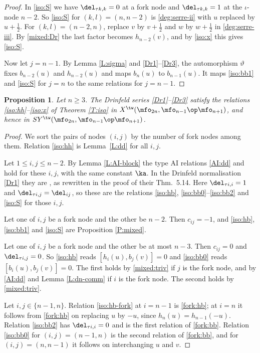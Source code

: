 \documentclass{amsart}
\newtheorem{prop}[theorem]{Proposition}
\numberwithin{equation}{section}
\theoremstyle{remark}
\renewcommand{\,}{\kern 0.1em} %
\begin{document}
\begin{proof}
In \eqref{iso:S} we have $\del_{\tau k,k}=0$ at a fork node and $\del_{\tau k,k}=1$ at the
$\iota$-node $n-2$. So \eqref{iso:S} for $(k,l)=(n,n-2)$ is \eqref{deg:serre-ii} with $u$
replaced by $u+\frac12$. For $(k,l)=(n-2,n)$, replace $v$ by $v+\frac12$ and $w$ by $w+\frac12$ in
\eqref{deg:serre-iii}. By \eqref{mixed:Dr} the last factor becomes $h_{n-2}(v)$, and by
\eqref{iso:x} this gives \eqref{iso:S}.

Now let $j=n-1$. By Lemma \ref{L:sigma} and \eqref{Dr1}--\eqref{Dr3}, the automorphism
$\vartheta$ fixes $b_{n-2}(u)$ and $h_{n-2}(u)$ and maps $b_n(u)$ to $b_{n-1}(u)$. It maps
\eqref{iso:bb1} and \eqref{iso:S} for $j=n$ to the same relations for $j=n-1$.
%
\end{proof}

\begin{prop} \label{P:rels}
%
Let $n\ge3$. The Drinfeld series \eqref{Dr1}--\eqref{Dr3} satisfy the relations
\eqref{iso:hh}--\eqref{iso:x} of Theorem \ref{T:iso} in
$X^\tw(\mfo_{2n},\mfo_{n-1}\op\mfo_{n+1})$, and hence in $SY^\tw(\mfo_{2n},\mfo_{n-1}\op\mfo_{n+1})$.
%
\end{prop}

\begin{proof}
%
We sort the pairs of nodes $(i,j)$ by the number of fork nodes among them. Relation
\eqref{iso:hh} is Lemma~\ref{L:dd} for all $i,j$.

Let $1\le i,j\le n-2$. By Lemma \ref{L:AI-block} the type AI relations \eqref{AI:dd} and
\cite[(5.5)--(5.10)]{Re26} hold for these $i,j$, with the same constant $\ka$. In the Drinfeld
normalisation \eqref{Dr1} they are \cite[(5.106)--(5.110)]{Re26}, as rewritten in the proof of
their Thm.~5.14. Here $\del_{\tau i,i}=1$ and $\del_{\tau i,j}=\del_{ij}$, so these are the
relations \eqref{iso:hb}, \eqref{iso:bb0}--\eqref{iso:bb2} and \eqref{iso:S} for those $i,j$.

Let one of $i,j$ be a fork node and the other be $n-2$. Then $c_{ij}=-1$, and
\eqref{iso:hb}, \eqref{iso:bb1} and \eqref{iso:S} are Proposition \ref{P:mixed}.

Let one of $i,j$ be a fork node and the other be at most $n-3$. Then $c_{ij}=0$ and
$\del_{\tau i,j}=0$. So \eqref{iso:hb} reads $[h_i(u),b_j(v)]=0$ and \eqref{iso:bb0} reads
$[b_i(u),b_j(v)]=0$. The first holds by \eqref{mixed:triv} if $j$ is the fork node, and by
\eqref{AI:dd} and Lemma \ref{L:dn-comm} if $i$ is the fork node. The second holds by
\eqref{mixed:triv}.

Let $i,j\in\{n-1,n\}$. Relation \eqref{iso:hb-fork} at $i=n-1$ is \eqref{fork:hb}; at $i=n$ it
follows from \eqref{fork:hb} on replacing $u$ by $-u$, since $h_n(u)=h_{n-1}(-u)$. Relation
\eqref{iso:bb2} has $\del_{\tau i,i}=0$ and is the first relation of \eqref{fork:bb}. Relation
\eqref{iso:bb0} for $(i,j)=(n-1,n)$ is the second relation of \eqref{fork:bb}, and for
$(i,j)=(n,n-1)$ it follows on interchanging $u$ and $v$. \qedhere
%
\end{proof}
\end{document}
